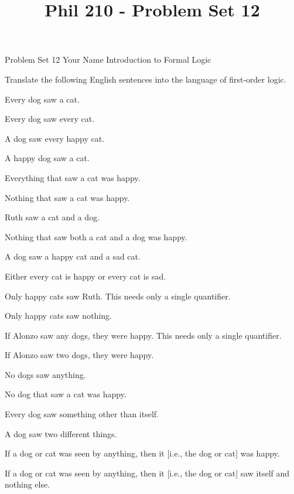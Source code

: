 
\title{Phil 210 - Problem Set 12}

\heading
Problem Set 12
Your Name
Introduction to Formal Logic
\endheading

Translate the following English sentences into the language of first-order logic.

\quantifiers
\problems
{}
Every dog saw a cat.
        \answer
        $ $
        \endanswer

Every dog saw every cat.
        \answer
        $ $
        \endanswer

A dog saw every happy cat.
        \answer
        $ $
        \endanswer

A happy dog saw a cat.
        \answer
        $ $
        \endanswer

Everything that saw a cat was happy.
        \answer
        $ $
        \endanswer

Nothing that saw a cat was happy.
        \answer
        $ $
        \endanswer

Ruth saw a cat and a dog.
        \answer
        $ $
        \endanswer

Nothing that saw both a cat and a dog was happy.
        \answer
        $ $
        \endanswer

A dog saw a happy cat and a sad cat.
        \answer
        $ $
        \endanswer

Either every cat is happy or every cat is sad.
        \answer
        $ $
        \endanswer

Only happy cats saw Ruth.
\Hint This needs only a single quantifier.
        \answer
        $ $
        \endanswer

Only happy cats saw nothing.
        \answer
        $ $
        \endanswer

If Alonzo saw any dogs, they were happy.
\Hint This needs only a single quantifier.
        \answer
        $ $
        \endanswer

If Alonzo saw two dogs, they were happy.
        \answer
        $ $
        \endanswer

No dogs saw anything.
        \answer
        $ $
        \endanswer

No dog that saw a cat was happy.
        \answer
        $ $
        \endanswer

Every dog saw something other than itself.
        \answer
        $ $
        \endanswer

A dog saw two different things.
        \answer
        $ $
        \endanswer

If a dog or cat was seen by anything, then it [i.e., the dog or cat] was happy.
        \answer
        $ $
        \endanswer

If a dog or cat was seen by anything, then it [i.e., the dog or cat] saw itself and nothing else.
        \answer
        $ $
        \endanswer

\endproblems
\bye
